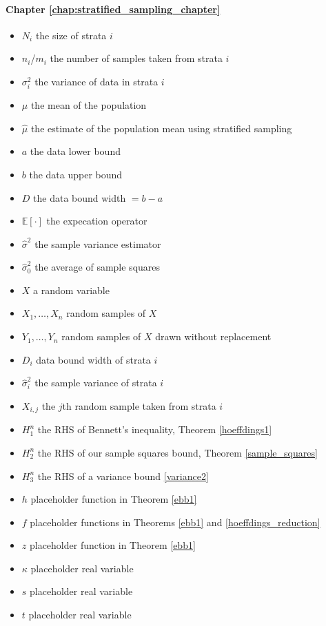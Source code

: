 \paragraph*{Chapter \ref{chap:stratified_sampling_chapter}}
\begin{itemize}
\item	$N_i$ the size of strata $i$
\item	$n_i$/$m_i$ the number of samples taken from strata $i$
\item	$\sigma_i^2$ the variance of data in strata $i$
\item	$\mu$ the mean of the population
\item	$\hat{\mu}$ the estimate of the population mean using stratified sampling
\item	$a$ the data lower bound
\item	$b$ the data upper bound
\item	$D$ the data bound width $=b-a$
\item	$\mathbb{E}[\cdot]$ the expecation operator
\item	$\hat{\sigma}^2$ the sample variance estimator
\item	$\hat{\sigma}_0^2$ the average of sample squares
\item	$X$ a random variable
\item	$X_1,\dots,X_n$ random samples of $X$
\item	$Y_1,\dots,Y_n$ random samples of $X$ drawn without replacement
\item	$D_i$ data bound width of strata $i$
\item	$\hat{\sigma}^2_i$ the sample variance of strata $i$
\item	$X_{i,j}$ the $j$th random sample taken from strata $i$
\item	$H_1^n$ the RHS of Bennett's inequality, Theorem \ref{hoeffdings1}
\item	$H_2^n$ the RHS of our sample squares bound, Theorem \ref{sample_squares}
\item	$H_3^n$ the RHS of a variance bound \ref{variance2}
\item	$h$ placeholder function in Theorem \ref{ebb1}
\item	$f$ placeholder functions in Theorems \ref{ebb1} and \ref{hoeffdings_reduction}
\item	$z$ placeholder function in Theorem \ref{ebb1}
\item	$\kappa$ placeholder real variable
\item	$s$ placeholder real variable
\item	$t$ placeholder real variable

\end{itemize}

